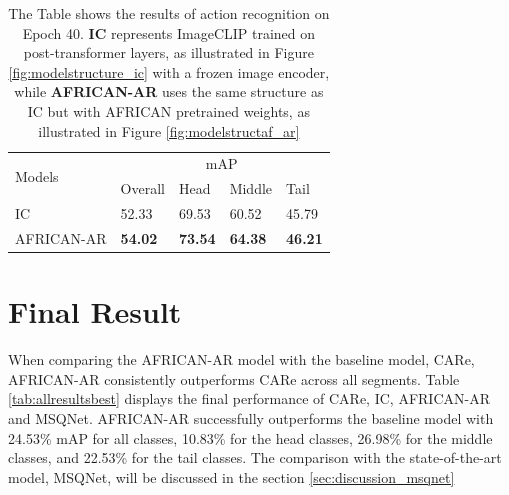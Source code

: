\begin{table}[ht]
    \centering
    \caption[Results of action recognition (Epoch 40)]{The Table shows the results of action recognition on Epoch 40. \textbf{IC} represents ImageCLIP trained on post-transformer layers, as illustrated in Figure \ref{fig:modelstructure_ic} with a frozen image encoder, while \textbf{AFRICAN-AR} uses the same structure as IC but with AFRICAN pretrained weights, as illustrated in Figure \ref{fig:modelstructaf_ar}}
    \label{tab:allresults40}
    \begin{tabular}{lllll}
        \toprule
        \multirow{2}{*}{Models} & \multicolumn{4}{c}{mAP} \\
        \cmidrule{2-5} 
        {} & Overall & Head  & Middle & Tail \\
        \midrule
        IC            & 52.33   & 69.53 & 60.52 & 45.79 \\        
        AFRICAN-AR    & \textbf{54.02} & \textbf{73.54} & \textbf{64.38} & \textbf{46.21} \\
        \bottomrule
    \end{tabular}
\end{table}


\section{Final Result}
When comparing the AFRICAN-AR model with the baseline model, CARe, AFRICAN-AR consistently outperforms CARe across all segments. Table \ref{tab:allresultsbest} displays the final performance of CARe, IC, AFRICAN-AR and MSQNet. AFRICAN-AR successfully outperforms the baseline model with 24.53\% mAP for all classes, 10.83\% for the head classes, 26.98\% for the middle classes, and 22.53\% for the tail classes. The comparison with the state-of-the-art model, MSQNet, will be discussed in the section \ref{sec:discussion_msqnet}

